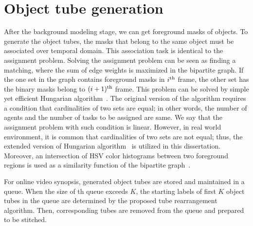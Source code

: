 \documentclass[11pt]{hyu_thesis}
\begin{document}
\section{Object tube generation}
\label{sec:framework:tube_gen}
After the background modeling stage, we can get foreground masks of objects. To generate the object tubes, the masks that belong to the same object must be associated over temporal domain. This association task is identical to the assignment problem. Solving the assignment problem can be seen as finding a matching, where the sum of edge weights is maximized in the bipartite graph. If the one set in the graph contains foreground masks in $i^{\rm{th}}$ frame, the other set has the binary masks belong to $(i+1)^{\rm{th}}$ frame. This problem can be solved by simple yet efficient Hungarian algorithm~\cite{Kuhn1955,kuhn1956variants,munkres1957algorithms}. The original version of the algorithm requires a condition that cardinalities of two sets are equal; in other words, the number of agents and the number of tasks to be assigned are same. We say that the assignment problem with such condition is linear. However, in real world environment, it is common that cardinalities of two sets are not equal; thus, the extended version of Hungarian algorithm~\cite{bourgeois1971extension} is utilized in this dissertation. Moreover, an intersection of HSV color histograms between two foreground regions is used as a similarity function of the bipartite graph~\cite{perez2002color}.

For online video synopsis, generated object tubes are stored and maintained in a queue. When the size of th queue exceeds $K$, the starting labels of first $K$ object tubes in the queue are determined by the proposed tube rearrangement algorithm. Then, corresponding tubes are removed from the queue and prepared to be stitched.
\end{document}
